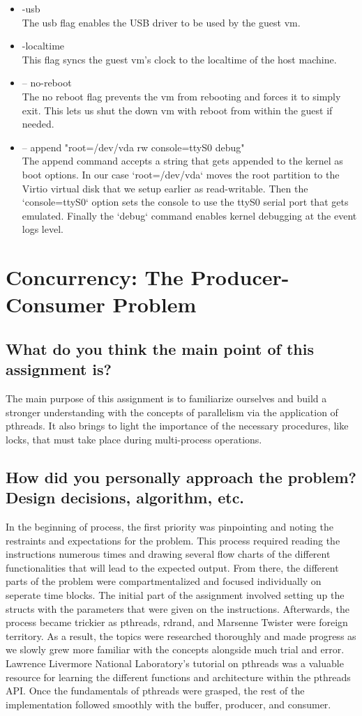 \documentclass[letterpaper,10pt,draftclsnofoot,onecolumn]{IEEEtran}
\begin{document}
\begin{itemize}
\item -usb\\
The usb flag enables the USB driver to be used by the guest vm.
\item -localtime\\
This flag syncs the guest vm's clock to the localtime of the host machine.
\item -- no-reboot\\
The no reboot flag prevents the vm from rebooting and forces it to simply exit. This lets us shut the down vm with reboot from within the guest if needed.
\item -- append "root=/dev/vda rw console=ttyS0 debug"\\
The append command accepts a string that gets appended to the kernel as boot options. In our case `root=/dev/vda` moves the root partition to the Virtio virtual disk that we setup earlier as read-writable. Then the `console=ttyS0` option sets the console to use the ttyS0 serial port that gets emulated. Finally the `debug` command enables kernel debugging at the event logs level.
\end{itemize}

\section{Concurrency: The Producer-Consumer Problem}
\subsection{What do you think the main point of this assignment is?}
The main purpose of this assignment is to familiarize ourselves and build a stronger understanding with 
the concepts of parallelism via the application of pthreads. It also brings to light the importance of the 
necessary procedures, like locks, that must take place during multi-process operations.
\subsection{How did you personally approach the problem? Design decisions, algorithm, etc.}
In the beginning of process, the first priority was pinpointing and noting the restraints and expectations for the problem.
This process required reading the instructions numerous times and drawing several flow charts of the different functionalities that will
lead to the expected output. From there, the different parts of the problem were compartmentalized and focused individually on seperate time blocks.
The initial part of the assignment involved setting up the structs with the parameters that were given on the instructions. Afterwards,
the process became trickier as pthreads, rdrand, and Marsenne Twister were foreign territory. As a result, the topics were researched thoroughly
and made progress as we slowly grew more familiar with the concepts alongside much trial and error. Lawrence Livermore National Laboratory's tutorial
on pthreads was a valuable resource for learning the different functions and architecture within the pthreads API. Once the fundamentals of pthreads were 
grasped, the rest of the implementation followed smoothly with the buffer, producer, and consumer. 
\end{document}
